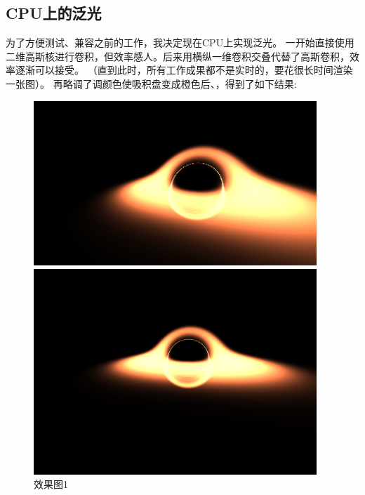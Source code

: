 \documentclass[a4paper, 12pt]{article}
\begin{document}
    \subsection{CPU上的泛光}
    为了方便测试、兼容之前的工作，我决定现在CPU上实现泛光。
    一开始直接使用二维高斯核进行卷积，但效率感人。后来用横纵一维卷积交叠代替了高斯卷积，效率逐渐可以接受。
    （直到此时，所有工作成果都不是实时的，要花很长时间渲染一张图）。
    再略调了调颜色使吸积盘变成橙色后、，得到了如下结果:
    \begin{figure}[H]
        \centering
        \begin{minipage}[t]{0.48\textwidth}
            \centering
            \includegraphics[width=0.95\textwidth]{photo/bloom0.png}
            \caption{效果图1}
        \end{minipage}
        \hfill
        \begin{minipage}[t]{0.48\textwidth}
            \centering
            \includegraphics[width=0.95\textwidth]{photo/bloom1.png}

\end{minipage}
\end{figure}
\end{document}
